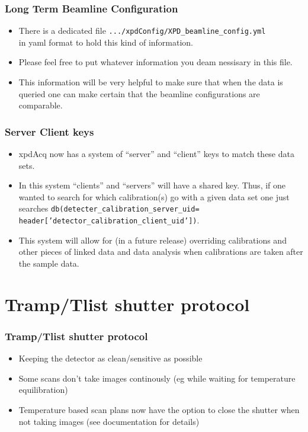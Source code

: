 \documentclass{beamer}
\begin{document}
\begin{frame}
\frametitle{Long Term Beamline Configuration}
\begin{itemize}
\item There is a dedicated file
\texttt{.../xpdConfig/XPD\_beamline\_config.yml}\\
in yaml format to hold this kind of information.

\item Please feel free to put whatever information you deam nessisary in this file.

\item This information will be very helpful to make sure that when the data is
queried one can make certain that the beamline configurations are comparable.
\end{itemize}
\end{frame}

\begin{frame}
\frametitle{Server Client keys}
\begin{itemize}
\item xpdAcq now has a system of ``server'' and ``client'' keys to match these data
sets.

\item In this system ``clients'' and ``servers'' will have a shared key.
Thus, if one wanted to search for which calibration(s) go with a given data set
one just searches
\texttt{db(detecter\_calibration\_server\_uid=
header['detector\_calibration\_client\_uid'])}.

\item This system will allow for (in a future release) overriding calibrations and
other pieces of linked data and data analysis when calibrations are taken after
the sample data.
\end{itemize}
\end{frame}

\section{Tramp/Tlist shutter protocol}

\begin{frame}
\frametitle{Tramp/Tlist shutter protocol}
\begin{itemize}
\item Keeping the detector as clean/sensitive as possible
\item Some scans don't take images continously
(eg while waiting for temperature equilibration)
\item Temperature based scan plans now have the option to close the shutter
when not taking images (see documentation for details)
\end{itemize}
\end{frame}
\end{document}
